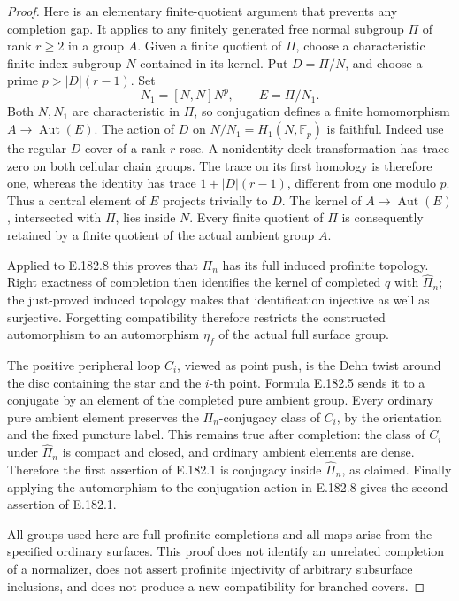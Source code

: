 \begin{proof}
Here is an elementary finite-quotient argument that prevents
any completion gap.  It applies to any finitely generated
free normal subgroup \(\Pi\) of rank \(r\geq2\) in a group
\(A\).  Given a finite quotient of \(\Pi\), choose a
characteristic finite-index subgroup \(N\) contained in its
kernel.  Put \(D=\Pi/N\), and choose a prime
\(p>|D|(r-1)\).  Set
\[
                 N_1=[N,N]N^p,\qquad E=\Pi/N_1.
\tag{E.182.9}
\]
Both \(N,N_1\) are characteristic in \(\Pi\), so conjugation
defines a finite homomorphism \(A\to\operatorname{Aut}(E)\).
The action of \(D\) on
\(N/N_1=H_1(N,\mathbb F_p)\) is faithful.
Indeed use the regular \(D\)-cover of a rank-\(r\) rose.
A nonidentity deck transformation has trace zero on both
cellular chain groups.  The trace on its first homology is
therefore one, whereas the identity has trace
\(1+|D|(r-1)\), different from one modulo \(p\).
Thus a central element of \(E\) projects trivially to \(D\).
The kernel of \(A\to\operatorname{Aut}(E)\), intersected
with \(\Pi\), lies inside \(N\).
Every finite quotient of \(\Pi\) is consequently retained
by a finite quotient of the actual ambient group \(A\).

Applied to E.182.8 this proves that \(\Pi_n\) has its full
induced profinite topology.  Right exactness of completion
then identifies the kernel of completed \(q\) with
\(\widehat\Pi_n\); the just-proved induced topology makes
that identification injective as well as surjective.
Forgetting compatibility therefore restricts the constructed
automorphism to an automorphism \(\eta_f\) of the actual
full surface group.

The positive peripheral loop \(C_i\), viewed as point push,
is the Dehn twist around the disc containing the star and
the \(i\)-th point.  Formula E.182.5 sends it to a conjugate
by an element of the completed pure ambient group.
Every ordinary pure ambient element preserves the
\(\Pi_n\)-conjugacy class of \(C_i\), by the orientation
and the fixed puncture label.  This remains true after
completion: the class of \(C_i\) under
\(\widehat\Pi_n\) is compact and closed, and ordinary
ambient elements are dense.  Therefore the first assertion
of E.182.1 is conjugacy inside \(\widehat\Pi_n\), as claimed.
Finally applying the automorphism to the conjugation action
in E.182.8 gives the second assertion of E.182.1.

All groups used here are full profinite completions and all
maps arise from the specified ordinary surfaces.  This proof
does not identify an unrelated completion of a normalizer,
does not assert profinite injectivity of arbitrary subsurface
inclusions, and does not produce a new compatibility for
branched covers.
\end{proof}

